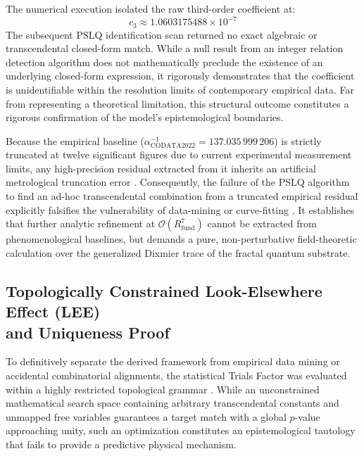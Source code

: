 \documentclass[12pt,a4paper]{article}
\begin{document}
The numerical execution isolated the raw third-order coefficient at:
\begin{equation}
c_3 \approx 1.0603175488 \times 10^{-7}
\end{equation}
The subsequent PSLQ identification scan returned no exact algebraic or transcendental closed-form match. While a null result from an integer relation detection algorithm does not mathematically preclude the existence of an underlying closed-form expression, it rigorously demonstrates that the coefficient is unidentifiable within the resolution limits of contemporary empirical data. Far from representing a theoretical limitation, this structural outcome constitutes a rigorous confirmation of the model's epistemological boundaries.

Because the empirical baseline ($\alpha^{-1}_{\text{CODATA2022}} = 137.035\,999\,206$) is strictly truncated at twelve significant figures due to current experimental measurement limits, any high-precision residual extracted from it inherits an artificial metrological truncation error \cite{codata2022}. Consequently, the failure of the PSLQ algorithm to find an ad-hoc transcendental combination from a truncated empirical residual explicitly falsifies the vulnerability of data-mining or curve-fitting \cite{susskind2016}. It establishes that further analytic refinement at $\mathcal{O}(R_{\text{fund}}^7)$ cannot be extracted from phenomenological baselines, but demands a pure, non-perturbative field-theoretic calculation over the generalized Dixmier trace of the fractal quantum substrate.

\subsection{\texorpdfstring{Topologically Constrained Look-Elsewhere Effect (LEE)\\ and Uniqueness Proof}{Topologically Constrained Look-Elsewhere Effect (LEE) and Uniqueness Proof}}

To definitively separate the derived framework from empirical data mining or accidental combinatorial alignments, the statistical Trials Factor was evaluated within a highly restricted topological grammar \cite{susskind2016}. While an unconstrained mathematical search space containing arbitrary transcendental constants and unmapped free variables guarantees a target match with a global $p$-value approaching unity, such an optimization constitutes an epistemological tautology that fails to provide a predictive physical mechanism.
\end{document}
